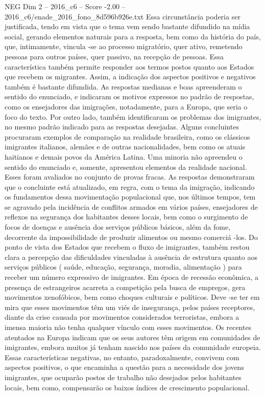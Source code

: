 \begin{textsample}{NEG Dim 2 – 2016\_c6 – Score -2.00 – 2016\_c6/enade\_2016\_fono\_8d596b926e.txt}
Essa circunstância poderia ser justificada, tendo em vista que o tema vem sendo bastante difundido na mídia social, gerando elementos naturais para a resposta, bem como da história do país, que, intimamente, vincula -se ao processo migratório, quer ativo, remetendo pessoas para outros países, quer passivo, na recepção de pessoas.
Essa característica também permite responder aos termos postos quanto aos Estados que recebem os migrantes.
Assim, a indicação dos aspectos positivos e negativos também é bastante difundida.
As respostas medianas e boas apreenderam o sentido do enunciado, e indicaram os motivos expressos no padrão de respostas, como os ensejadores das imigrações, notadamente, para a Europa, que seria o foco do texto.
Por outro lado, também identificaram os problemas dos imigrantes, no mesmo padrão indicado para as respostas desejadas.
Alguns concluintes procuraram exemplos de comparação na realidade brasileira, como os clássicos imigrantes italianos, alemães e de outras nacionalidades, bem como os atuais haitianos e demais povos da América Latina.
Uma minoria não apreendeu o sentido do enunciado e, somente, apresentou elementos da realidade nacional.
Esses foram avaliados no conjunto de provas fracas.
As respostas demonstraram que o concluinte está atualizado, em regra, com o tema da imigração, indicando os fundamentos dessa movimentação populacional que, nos últimos tempos, tem se agravado pela incidência de conflitos armados em vários países, ensejadores de reflexos na segurança dos habitantes desses locais, bem como o surgimento de focos de doenças e ausência dos serviços públicos básicos, além da fome, decorrente da impossibilidade de produzir alimentos ou mesmo comerciá -los.
Do ponto de vista dos Estados que recebem o fluxo de imigrantes, também restou clara a percepção das dificuldades vinculadas à ausência de estrutura quanto aos serviços públicos ( saúde, educação, segurança, moradia, alimentação ) para receber um número expressivo de imigrantes.
Em época de recessão econômica, a presença de estrangeiros acarreta a competição pela busca de empregos, gera movimentos xenofóbicos, bem como choques culturais e políticos.
Deve -se ter em mira que esses movimentos têm um viés de insegurança, pelos países receptores, diante da crise causada por movimentos considerados terroristas, embora a imensa maioria não tenha qualquer vínculo com esses movimentos.
Os recentes atentados na Europa indicam que os seus autores têm origem em comunidades de imigrantes, embora muitos já tenham nascido nos países da comunidade europeia.
Essas características negativas, no entanto, paradoxalmente, convivem com aspectos positivos, o que encaminha a questão para a necessidade dos jovens imigrantes, que ocuparão postos de trabalho não desejados pelos habitantes locais, bem como, compensarão os baixos índices de crescimento populacional.

\end{textsample}
